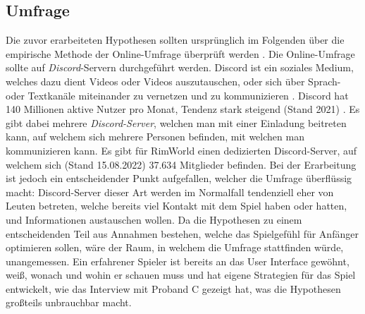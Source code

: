 \newpage
\subsection{Umfrage}
Die zuvor erarbeiteten Hypothesen sollten ursprünglich im Folgenden über die empirische Methode der Online-Umfrage überprüft werden \cite*[]{Evans2005TheVO}.  Die Online-Umfrage sollte auf \textit{Discord}-Servern durchgeführt werden. Discord ist ein soziales Medium, welches dazu dient Videos oder Videos auszutauschen, oder sich über Sprach- oder Textkanäle miteinander zu vernetzen und zu kommunizieren \cite*[]{discord:usage}. Discord hat 140 Millionen aktive Nutzer pro Monat, Tendenz stark steigend (Stand 2021) \cite*[]{discord:statistics}. Es gibt dabei mehrere \textit{Discord-Server}, welchen man mit einer Einladung beitreten kann, auf welchem sich mehrere Personen befinden, mit welchen man kommunizieren kann. Es gibt für RimWorld einen dedizierten Discord-Server, auf welchem sich (Stand 15.08.2022) 37.634 Mitglieder befinden. Bei der Erarbeitung ist jedoch ein entscheidender Punkt aufgefallen, welcher die Umfrage überflüssig macht: Discord-Server dieser Art werden im Normalfall tendenziell eher von Leuten betreten, welche bereits viel Kontakt mit dem Spiel haben oder hatten, und Informationen austauschen wollen. Da die Hypothesen zu einem entscheidenden Teil aus Annahmen bestehen, welche das Spielgefühl für Anfänger optimieren sollen, wäre der Raum, in welchem die Umfrage stattfinden würde, unangemessen. Ein erfahrener Spieler ist bereits an das User Interface gewöhnt, weiß, wonach und wohin er schauen muss und hat eigene Strategien für das Spiel entwickelt, wie das Interview mit Proband C gezeigt hat, was die Hypothesen großteils unbrauchbar macht.
